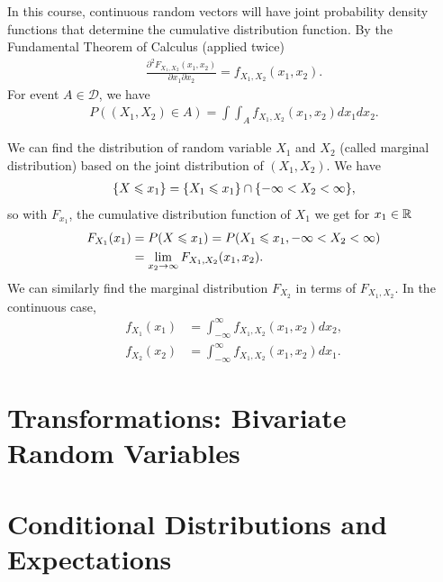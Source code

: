 \begin{remark}
    In this course, continuous random vectors will have joint probability
    density functions that determine the cumulative distribution function. By the
    Fundamental Theorem of Calculus (applied twice)
    \begin{align*}
        \frac{\partial^2 F_{X_1,X_2}(x_1,x_2)}{\partial x_1\partial x_2}=f_{X_1,X_2}(x_1,x_2).
    \end{align*}
    For event $A\in\mathcal{D}$, we have 
    \begin{align*}
        P((X_1,X_2)\in A)=\int\int_{A} f_{X_1,X_2}(x_1,x_2)dx_1dx_2.
    \end{align*}
\end{remark}



\begin{remark}
    We can find the distribution of random variable $X_1$ and $X_2$ 
    (called marginal distribution) based on the joint distribution of $(X_1,X_2)$.
    We have
    \begin{align*}
        \{X\leqslant x_1\} = \{X_1\leqslant x_1\}\cap \{-\infty<X_2<\infty\},
    \end{align*}
    so with $F_{x_1}$, the cumulative distribution function of $X_1$ we get for $x_1\in\mathbb{R}$
    \begin{align*}
        F_{X_1}(x_1) &= P(X\leqslant x_1)=P(X_1\leqslant x_1,-\infty<X_2<\infty)\\
                    &= \lim_{x_2\rightarrow \infty} F_{X_1,X_2}(x_1,x_2).
    \end{align*}
    We can similarly find the marginal distribution $F_{X_2}$ in terms of $F_{X_1,X_2}$.
    In the continuous case,
    \begin{align*}
        f_{X_1}(x_1)&=\int_{-\infty}^{\infty} f_{X_1,X_2}(x_1,x_2)dx_2,\\
        f_{X_2}(x_2)&=\int_{-\infty}^{\infty} f_{X_1,X_2}(x_1,x_2)dx_1.
    \end{align*}
\end{remark}


\section{Transformations: Bivariate Random Variables}

\section{Conditional Distributions and Expectations}



